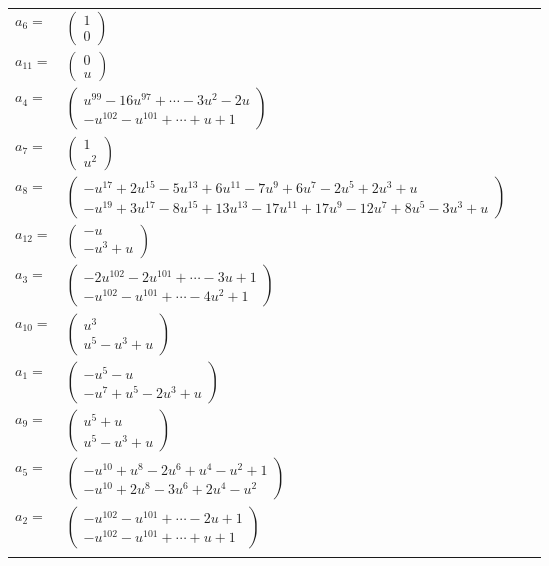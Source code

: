 \documentclass[1p]{elsarticle_modified}
\theoremstyle{definition}
\begin{document}
\begin{tabular}{m{7pt} m{180pt} m{7pt} m{180pt} }
\flushright $a_{6}=$&$\begin{pmatrix}1\\0\end{pmatrix}$ \\
\flushright $a_{11}=$&$\begin{pmatrix}0\\u\end{pmatrix}$ \\
\flushright $a_{4}=$&$\begin{pmatrix}u^{99}-16 u^{97}+\cdots-3 u^2-2 u\\- u^{102}- u^{101}+\cdots+u+1\end{pmatrix}$ \\
\flushright $a_{7}=$&$\begin{pmatrix}1\\u^2\end{pmatrix}$ \\
\flushright $a_{8}=$&$\begin{pmatrix}- u^{17}+2 u^{15}-5 u^{13}+6 u^{11}-7 u^9+6 u^7-2 u^5+2 u^3+u\\- u^{19}+3 u^{17}-8 u^{15}+13 u^{13}-17 u^{11}+17 u^9-12 u^7+8 u^5-3 u^3+u\end{pmatrix}$ \\
\flushright $a_{12}=$&$\begin{pmatrix}- u\\- u^3+u\end{pmatrix}$ \\
\flushright $a_{3}=$&$\begin{pmatrix}-2 u^{102}-2 u^{101}+\cdots-3 u+1\\- u^{102}- u^{101}+\cdots-4 u^2+1\end{pmatrix}$ \\
\flushright $a_{10}=$&$\begin{pmatrix}u^3\\u^5- u^3+u\end{pmatrix}$ \\
\flushright $a_{1}=$&$\begin{pmatrix}- u^5- u\\- u^7+u^5-2 u^3+u\end{pmatrix}$ \\
\flushright $a_{9}=$&$\begin{pmatrix}u^5+u\\u^5- u^3+u\end{pmatrix}$ \\
\flushright $a_{5}=$&$\begin{pmatrix}- u^{10}+u^8-2 u^6+u^4- u^2+1\\- u^{10}+2 u^8-3 u^6+2 u^4- u^2\end{pmatrix}$ \\
\flushright $a_{2}=$&$\begin{pmatrix}- u^{102}- u^{101}+\cdots-2 u+1\\- u^{102}- u^{101}+\cdots+u+1\end{pmatrix}$\\&\end{tabular}
\end{document}

